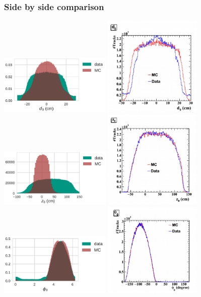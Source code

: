 \documentclass[18pt]{beamer}
\begin{document}
\begin{frame}[allowframebreaks]
  \frametitle{Side by side comparison}
  \includegraphics[width=0.4\textwidth]{figures/gcr_august_2017_d0_distribution.pdf}
  \includegraphics[width=0.35\textwidth]{figures/b2gm_d0.png}\\
  
  \includegraphics[width=0.4\textwidth]{figures/gcr_august_2017_z0_distribution.pdf}
  \includegraphics[width=0.35\textwidth]{figures/b2gm_z0.png}\\
  
  \includegraphics[width=0.4\textwidth]{figures/gcr_august_2017_phi0_distribution.pdf}
  \includegraphics[width=0.35\textwidth]{figures/b2gm_phi0.png}\\
  

\end{frame}
\end{document}
